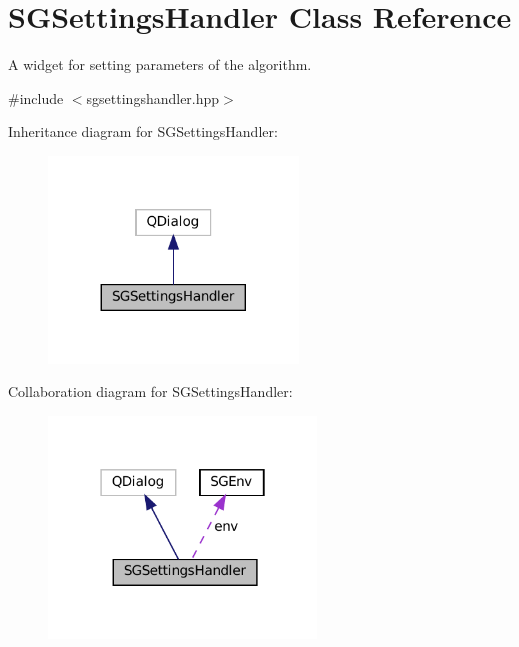 \hypertarget{classSGSettingsHandler}{}\section{S\+G\+Settings\+Handler Class Reference}
\label{classSGSettingsHandler}


A widget for setting parameters of the algorithm.  




{\ttfamily \#include $<$sgsettingshandler.\+hpp$>$}



Inheritance diagram for S\+G\+Settings\+Handler\+:
\nopagebreak
\begin{figure}[H]
\begin{center}
\leavevmode
\includegraphics[width=188pt]{classSGSettingsHandler__inherit__graph}
\end{center}
\end{figure}


Collaboration diagram for S\+G\+Settings\+Handler\+:
\nopagebreak
\begin{figure}[H]
\begin{center}
\leavevmode
\includegraphics[width=202pt]{classSGSettingsHandler__coll__graph}
\end{center}
\end{figure}
